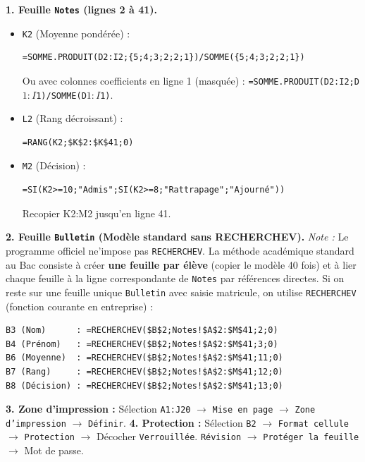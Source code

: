 \documentclass[11pt]{article}
\begin{document}
\begin{corrige}
\textbf{1. Feuille \texttt{Notes} (lignes 2 à 41).}
\begin{itemize}
\item \texttt{K2} (Moyenne pondérée) :
\begin{lstlisting}
=SOMME.PRODUIT(D2:I2;{5;4;3;2;2;1})/SOMME({5;4;3;2;2;1})
\end{lstlisting}
Ou avec colonnes coefficients en ligne 1 (masquée) : \texttt{=SOMME.PRODUIT(D2:I2;D$1:I$1)/SOMME(D$1:I$1)}.
\item \texttt{L2} (Rang décroissant) :
\begin{lstlisting}
=RANG(K2;$K$2:$K$41;0)
\end{lstlisting}
\item \texttt{M2} (Décision) :
\begin{lstlisting}
=SI(K2>=10;"Admis";SI(K2>=8;"Rattrapage";"Ajourné"))
\end{lstlisting}
Recopier K2:M2 jusqu'en ligne 41.
\end{itemize}
\textbf{2. Feuille \texttt{Bulletin} (Modèle standard sans RECHERCHEV).}
\emph{Note :} Le programme officiel ne'impose pas \texttt{RECHERCHEV}. La méthode académique standard au Bac consiste à créer \textbf{une feuille par élève} (copier le modèle 40 fois) et à lier chaque feuille à la ligne correspondante de \texttt{Notes} par références directes.
Si on reste sur une feuille unique \texttt{Bulletin} avec saisie matricule, on utilise \texttt{RECHERCHEV} (fonction courante en entreprise) :
\begin{lstlisting}
B3 (Nom)      : =RECHERCHEV($B$2;Notes!$A$2:$M$41;2;0)
B4 (Prénom)   : =RECHERCHEV($B$2;Notes!$A$2:$M$41;3;0)
B6 (Moyenne)  : =RECHERCHEV($B$2;Notes!$A$2:$M$41;11;0)
B7 (Rang)     : =RECHERCHEV($B$2;Notes!$A$2:$M$41;12;0)
B8 (Décision) : =RECHERCHEV($B$2;Notes!$A$2:$M$41;13;0)
\end{lstlisting}
\textbf{3. Zone d'impression :} Sélection \texttt{A1:J20} $\rightarrow$ \texttt{Mise en page} $\rightarrow$ \texttt{Zone d'impression} $\rightarrow$ \texttt{Définir}.
\textbf{4. Protection :} Sélection \texttt{B2} $\rightarrow$ \texttt{Format cellule} $\rightarrow$ \texttt{Protection} $\rightarrow$ Décocher \texttt{Verrouillée}. \texttt{Révision} $\rightarrow$ \texttt{Protéger la feuille} $\rightarrow$ Mot de passe.
\end{corrige}
\end{document}

